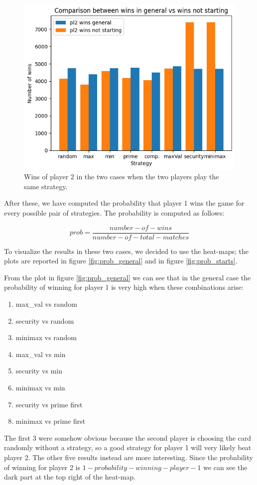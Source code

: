 \begin{figure}
    \centering
    \includegraphics[width=0.9\linewidth]{img/comparison_winning_not_starts_general_pl2.png}
    \caption{Wins of player 2 in the two cases when the two players play the same strategy.}
    \label{fig:comparison_pl2}
\end{figure}

After these, we have computed the probability that player 1 wins the game for every possible pair of strategies. The probability is computed as follows:

\begin{equation} \label{eq:probability_cal}
    prob = \frac{number-of-wins}{number-of-total-matches}
\end{equation}

To visualize the results in these two cases, we decided to use the heat-maps; the plots are reported in figure \ref{fig:prob_general} and in figure \ref{fig:prob_starts}. 

From the plot in figure \ref{fig:prob_general} we can see that in the general case the probability of winning for player 1 is very high when these combinations arise:
\begin{enumerate}
    \item max\_val vs random
    \item security vs random
    \item minimax vs random
    \item max\_val vs min
    \item security vs min
    \item minimax vs min
    \item security vs prime first
    \item minimax vs prime first
\end{enumerate}
The first 3 were somehow obvious because the second player is choosing the card randomly without a strategy, so a good strategy for player 1 will very likely beat player 2. The other five results instead are more interesting. 
Since the probability of winning for player 2 is $1 - probability-winning-player-1$ we can see the dark part at the top right of the heat-map.

